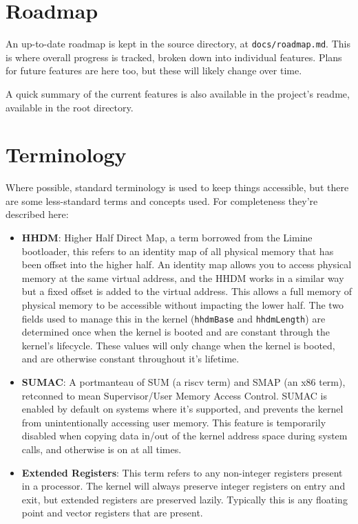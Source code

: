 \section{Roadmap}
An up-to-date roadmap is kept in the source directory, at \verb|docs/roadmap.md|. This is where overall progress is tracked, broken down into individual features. Plans for future features are here too, but these will likely change over time.

A quick summary of the current features is also available in the project's readme, available in the root directory.

\section{Terminology}
Where possible, standard terminology is used to keep things accessible, but there are some less-standard terms and concepts used. For completeness they're described here:

\begin{itemize}
    \item \textbf{HHDM}: Higher Half Direct Map, a term borrowed from the Limine bootloader, this refers to an identity map of all physical memory that has been offset into the higher half. An identity map allows you to access physical memory at the same virtual address, and the HHDM works in a similar way but a fixed offset is added to the virtual address. This allows a full memory of physical memory to be accessible without impacting the lower half. The two fields used to manage this in the kernel (\verb|hhdmBase| and \verb|hhdmLength|) are determined once when the kernel is booted and are constant through the kernel's lifecycle. These values will only change when the kernel is booted, and are otherwise constant throughout it's lifetime. 
    \item \textbf{SUMAC}: A portmanteau of SUM (a riscv term) and SMAP (an x86 term), retconned to mean Supervisor/User Memory Access Control. SUMAC is enabled by default on systems where it's supported, and prevents the kernel from unintentionally accessing user memory. This feature is temporarily disabled when copying data in/out of the kernel address space during system calls, and otherwise is on at all times.
    \item \textbf{Extended Registers}: This term refers to any non-integer registers present in a processor. The kernel will always preserve integer registers on entry and exit, but extended registers are preserved lazily. Typically this is any floating point and vector registers that are present.
\end{itemize}

